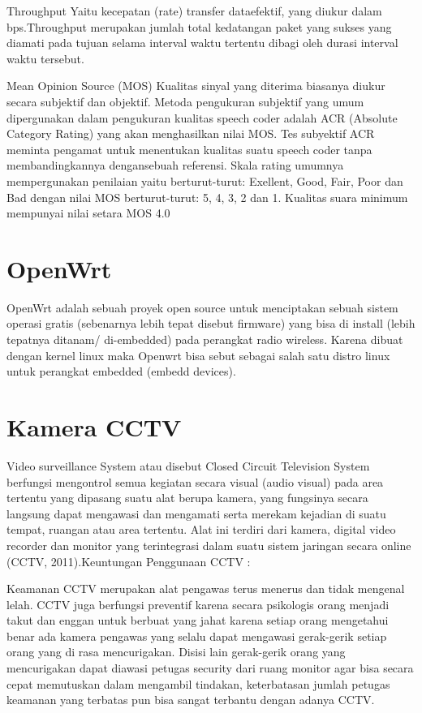 \documentclass{jtetiproposalskripsi}
\begin{document}
Throughput
Yaitu kecepatan (rate) transfer dataefektif, yang diukur dalam bps.Throughput merupakan jumlah total kedatangan paket yang sukses yang diamati pada tujuan selama interval waktu tertentu dibagi oleh durasi interval waktu tersebut.

Mean Opinion Source (MOS)
Kualitas sinyal yang diterima biasanya diukur secara subjektif dan objektif. Metoda pengukuran subjektif yang umum dipergunakan dalam pengukuran kualitas speech coder adalah ACR (Absolute Category Rating) yang akan menghasilkan nilai MOS. Tes subyektif ACR meminta pengamat untuk menentukan kualitas suatu speech coder tanpa membandingkannya dengansebuah referensi. Skala rating umumnya mempergunakan penilaian yaitu berturut-turut: Exellent, Good, Fair, Poor dan Bad dengan nilai MOS berturut-turut: 5, 4, 3, 2 dan 1. Kualitas suara minimum mempunyai nilai setara MOS 4.0


\section{OpenWrt}
OpenWrt adalah sebuah proyek open source untuk menciptakan sebuah sistem operasi gratis (sebenarnya lebih tepat disebut firmware) yang bisa di install (lebih tepatnya ditanam/ di-embedded) pada perangkat radio wireless. Karena dibuat dengan kernel linux maka Openwrt bisa sebut sebagai salah satu distro linux untuk perangkat embedded (embedd devices).

\section{Kamera CCTV}
Video surveillance System atau disebut Closed Circuit Television System berfungsi mengontrol semua kegiatan secara visual (audio visual) pada area tertentu yang dipasang suatu alat berupa kamera, yang fungsinya secara langsung dapat mengawasi dan mengamati serta merekam kejadian di suatu tempat, ruangan atau area tertentu. Alat ini terdiri dari kamera, digital video recorder dan monitor yang terintegrasi dalam suatu sistem jaringan secara online (CCTV, 2011).Keuntungan Penggunaan CCTV :

Keamanan CCTV merupakan alat pengawas terus menerus dan tidak mengenal lelah. CCTV juga berfungsi preventif karena secara psikologis orang menjadi takut dan enggan untuk berbuat yang jahat karena setiap orang mengetahui benar ada kamera pengawas yang selalu dapat mengawasi gerak-gerik setiap orang yang di rasa mencurigakan. Disisi lain gerak-gerik orang yang mencurigakan dapat diawasi petugas security dari ruang monitor agar bisa secara cepat memutuskan dalam mengambil tindakan, keterbatasan jumlah petugas keamanan yang terbatas pun bisa sangat terbantu dengan adanya CCTV.
\end{document}
